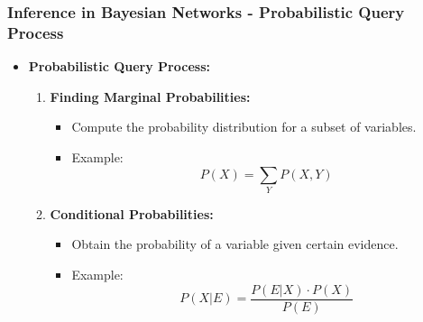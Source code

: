 \documentclass[aspectratio=169]{beamer}
\begin{document}
\begin{frame}[fragile]
    \frametitle{Inference in Bayesian Networks - Probabilistic Query Process}
    \begin{itemize}
        \item \textbf{Probabilistic Query Process:}
        \begin{enumerate}
            \item \textbf{Finding Marginal Probabilities:}
            \begin{itemize}
                \item Compute the probability distribution for a subset of variables.
                \item Example: 
                \[
                P(X) = \sum_{Y} P(X, Y)
                \]
            \end{itemize}
            
            \item \textbf{Conditional Probabilities:}
            \begin{itemize}
                \item Obtain the probability of a variable given certain evidence.
                \item Example: 
                \[
                P(X|E) = \frac{P(E|X) \cdot P(X)}{P(E)}
                \]
            \end{itemize}
        \end{enumerate}
    \end{itemize}
\end{frame}
\end{document}
